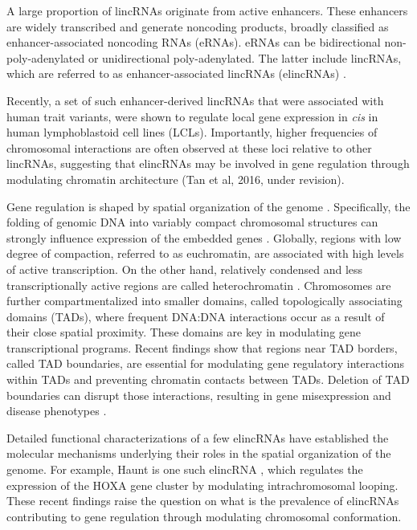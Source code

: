 \documentclass[11pt,a4paper]{report}
\begin{document}
A large proportion of lincRNAs originate from active enhancers. These enhancers are widely transcribed and generate noncoding products, broadly classified as enhancer-associated noncoding RNAs (eRNAs). eRNAs can be bidirectional non-poly-adenylated or unidirectional poly-adenylated. The latter include lincRNAs, which are referred to as enhancer-associated lincRNAs (elincRNAs) \cite{Guil2012}. 

Recently, a set of such enhancer-derived lincRNAs that were associated with human trait variants, were shown to regulate local gene expression in \textit{cis} in human lymphoblastoid cell lines (LCLs). Importantly, higher frequencies of chromosomal interactions are often observed at these loci relative to other lincRNAs, suggesting that elincRNAs may be involved in gene regulation through modulating chromatin architecture (Tan et al, 2016, under revision).

Gene regulation is shaped by spatial organization of the genome \cite{Engreitz2016}⁠⁠. Specifically, the folding of genomic DNA into variably compact chromosomal structures can strongly influence expression of the embedded genes \cite{Gorkin2014}⁠⁠. Globally, regions with low degree of compaction, referred to as euchromatin, are associated with high levels of active transcription. On the other hand, relatively condensed and less transcriptionally active regions are called heterochromatin \cite{Passarge1979}\cite{Tamaru2010}⁠. Chromosomes are further compartmentalized into smaller domains, called topologically associating domains (TADs), where frequent DNA:DNA interactions occur as a result of their close spatial proximity. These domains are key in modulating gene transcriptional programs. Recent findings show that regions near TAD borders, called TAD boundaries, are essential for modulating gene regulatory interactions within TADs and preventing chromatin contacts between TADs. Deletion of TAD boundaries can disrupt those interactions, resulting in gene misexpression and disease phenotypes \cite{Lupianez2015}⁠.

Detailed functional characterizations of a few elincRNAs have established the molecular mechanisms underlying their roles in the spatial organization of the genome. For example, Haunt is one such elincRNA \cite{Yin2015}⁠⁠, which regulates the expression of the HOXA gene cluster by modulating intrachromosomal looping. These recent findings raise the question on what is the prevalence of elincRNAs contributing to gene regulation through modulating chromosomal conformation.
\end{document}
